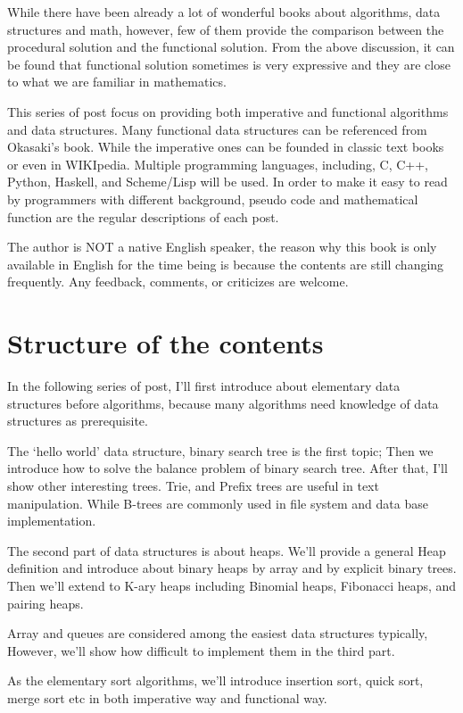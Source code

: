 \documentclass[b5paper]{article}
\begin{document}
While there have been already a lot of wonderful books about
algorithms, data structures and math, however, few of them
provide the comparison between the procedural solution and
the functional solution. From the above discussion, it can be
found that functional solution sometimes is very expressive
and they are close to what we are familiar in mathematics.

This series of post focus on providing both imperative and functional
algorithms and data structures. Many functional data structures
can be referenced from Okasaki's book\cite{okasaki-book}. While
the imperative ones can be founded in classic text books \cite{CLRS}
or even in WIKIpedia.
Multiple
programming languages, including, C, C++, Python, Haskell, and
Scheme/Lisp will be used. In order to make it easy to read
by programmers with different background, pseudo code and mathematical
function are the regular descriptions of each post.

The author is NOT a native English speaker, the reason why
this book is only available in English for the time being
is because the contents are still changing frequently. Any
feedback, comments, or criticizes are welcome.

\section{Structure of the contents}
In the following series of post, I'll first introduce about
elementary data structures before algorithms, because many
algorithms need knowledge of data structures as prerequisite.

The `hello world' data structure, binary search tree is the
first topic; Then we introduce how to solve the balance problem
of binary search tree. After that, I'll show other interesting
trees. Trie, and Prefix trees are useful in text manipulation.
While B-trees are commonly used in file system and data base
implementation.

The second part of data structures is about heaps. We'll
provide a general Heap definition and introduce about binary
heaps by array and by explicit binary trees. Then we'll
extend to K-ary heaps including Binomial heaps, Fibonacci
heaps, and pairing heaps.

Array and queues are considered among the easiest data structures
typically, However, we'll show how difficult to implement
them in the third part.

As the elementary sort algorithms, we'll introduce insertion
sort, quick sort, merge sort etc in both imperative way
and functional way.
\end{document}
